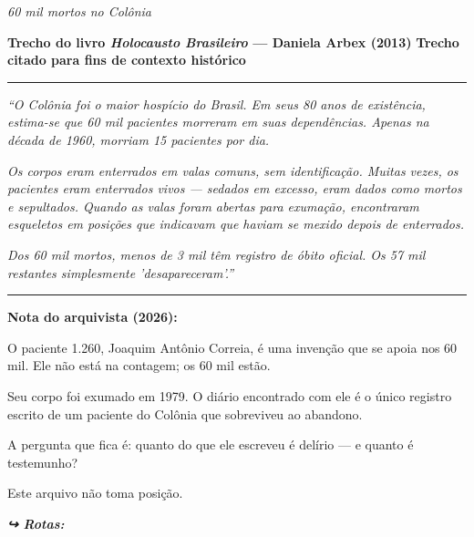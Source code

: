 
\noindent \textit{60 mil mortos no Colônia}

\noindent \textbf{Trecho do livro \textit{Holocausto Brasileiro} --- Daniela Arbex (2013)}
\textbf{Trecho citado para fins de contexto histórico}

\vspace{0.5em}\noindent\rule{\textwidth}{0.5pt}\vspace{0.5em}

\noindent \textit{\textquotedblleft{}O Colônia foi o maior hospício do Brasil. Em seus 80 anos de existência, estima-se que 60 mil pacientes morreram em suas dependências. Apenas na década de 1960, morriam 15 pacientes por dia.}

\noindent \textit{Os corpos eram enterrados em valas comuns, sem identificação. Muitas vezes, os pacientes eram enterrados vivos --- sedados em excesso, eram dados como mortos e sepultados. Quando as valas foram abertas para exumação, encontraram esqueletos em posições que indicavam que haviam se mexido depois de enterrados.}

\noindent \textit{Dos 60 mil mortos, menos de 3 mil têm registro de óbito oficial. Os 57 mil restantes simplesmente 'desapareceram'.\textquotedblright{}}

\vspace{0.5em}\noindent\rule{\textwidth}{0.5pt}\vspace{0.5em}

\noindent \textbf{Nota do arquivista (2026):}

\noindent O paciente 1.260, Joaquim Antônio Correia, é uma invenção que se apoia nos 60 mil. Ele não está na contagem; os 60 mil estão.

\noindent Seu corpo foi exumado em 1979. O diário encontrado com ele é o único registro escrito de um paciente do Colônia que sobreviveu ao abandono.

\noindent A pergunta que fica é: quanto do que ele escreveu é delírio --- e quanto é testemunho?

\noindent Este arquivo não toma posição.

\vspace{0.5em}
\noindent\textit{\textbf{↪ Rotas:}  \rotasep {} \rotasep {}}